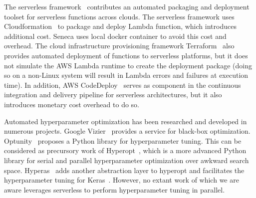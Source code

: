 The serverless framework~\cite{ref:serverless_framework} contributes an 
automated packaging and deployment toolset for serverless functions across clouds. 
The serverless framework uses Cloudformation~\cite{ref:cloudformation} to package and deploy Lambda function, which introduces additional cost. Seneca uses local docker container to avoid this cost
and overhead. The cloud infrastructure provisioning framework Terraform~\cite{ref:terraform} 
also provides automated deployment of functions to serverless platforms, but it does not simulate the AWS Lambda runtime to create the deployment package (doing so on a non-Linux system will result in Lambda errors and failures at execution time). 
In addition, AWS CodeDeploy~\cite{ref:codedeploy} serves as component in the continuous integration and delivery pipeline for serverless architectures, but it also introduces monetary cost overhead
to do so.

Automated hyperparameter optimization has been researched and developed 
in numerous projects. Google Vizier~\cite{ref:vizier} provides a service for 
black-box optimization. Optunity~\cite{ref:claesen2014hyperparameter} 
proposes a Python library for hyperparameter tuning. 
This can be considered as precursory work of Hyperopt~\cite{ref:hyperopt}, 
which is a more advanced Python library for serial and parallel hyperparameter 
optimization over awkward search space. Hyperas~\cite{ref:hyperas} adds another 
abstraction layer to hyperopt and facilitates the hyperparameter tuning for 
Keras~\cite{ref:keras}. However, no extant work of which we are aware leverages
serverless to perform hyperparameter tuning in parallel. 
